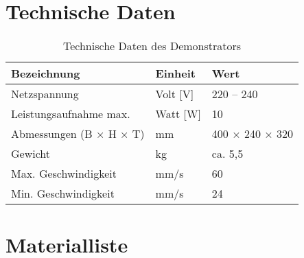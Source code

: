 \documentclass[a4paper,12pt]{report}
\begin{document}
	
	
	\chapter{Technische Daten}
	\begin{table}[h]
		\centering
		\begin{tabular}{|p{5cm}|p{3cm}|p{4cm}|}
			\hline
			\textbf{Bezeichnung} & \textbf{Einheit} & \textbf{Wert} \\ \hline
			Netzspannung & Volt [V] & 220 -- 240 \\ \hline
			Leistungsaufnahme max. & Watt [W] & 10 \\ \hline
			Abmessungen (B × H × T) & mm & 400 × 240 × 320 \\ \hline
			Gewicht & kg & ca. 5{,}5 \\ \hline
			Max. Geschwindigkeit & mm/s & 60 \\ \hline
			Min. Geschwindigkeit & mm/s & 24 \\ \hline
		\end{tabular}
		\caption{Technische Daten des Demonstrators}
		\label{tab:technische_daten}
	\end{table}
	
	\chapter{Materialliste}
	
\end{document}
